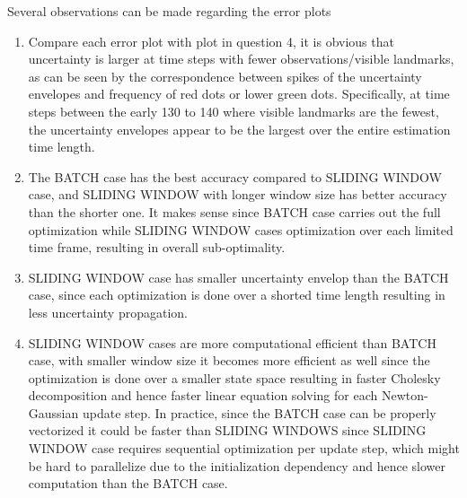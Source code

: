 \documentclass[a4paper]{article}
\begin{document}
Several observations can be made regarding the error plots 
\begin{enumerate}
    \item Compare each error plot with plot in question 4, it is obvious that uncertainty is larger at time steps with fewer observations/visible landmarks, as can be seen by the correspondence between spikes of the uncertainty envelopes and frequency of red dots or lower green dots. Specifically, at time steps between the early 130 to 140 where visible landmarks are the fewest, the uncertainty envelopes appear to be the largest over the entire estimation time length.  
    \item The BATCH case has the best accuracy compared to SLIDING WINDOW case, and SLIDING WINDOW with longer window size has better accuracy than the shorter one. It makes sense since BATCH case carries out the full optimization while SLIDING WINDOW cases optimization over each limited time frame, resulting in overall sub-optimality. 
    \item SLIDING WINDOW case has smaller uncertainty envelop than the BATCH case, since each optimization is done over a shorted time length resulting in less uncertainty propagation. 
    \item SLIDING WINDOW cases are more computational efficient than BATCH case, with smaller window size it becomes more efficient as well since the optimization is done over a smaller state space resulting in faster Cholesky decomposition and hence faster linear equation solving for each Newton-Gaussian update step. In practice, since the BATCH case can be properly vectorized it could be faster than SLIDING WINDOWS since SLIDING WINDOW case requires sequential optimization per update step, which might be hard to parallelize due to the initialization dependency and hence slower computation than the BATCH case.  
\end{enumerate}
\end{document}
